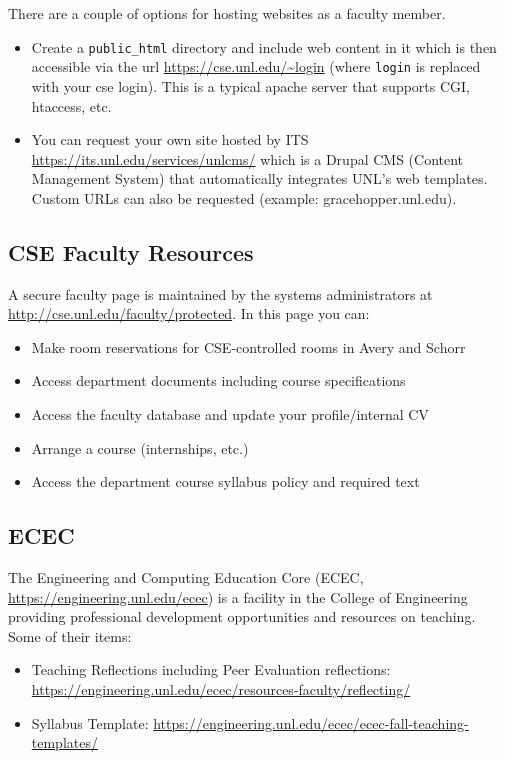 \documentclass[12pt]{scrartcl}
\begin{document}
There are a couple of options for hosting websites as a 
faculty member.

\begin{itemize}
  \item Create a \texttt{public_html} directory
  and include web content in it which is then accessible via the
  url \url{https://cse.unl.edu/~login} (where \texttt{login}
  is replaced with your cse login).  This is a typical apache server
  that supports CGI, htaccess, etc.
  \item You can request your own site hosted by ITS
  \url{https://its.unl.edu/services/unlcms/} which is a Drupal
  CMS (Content Management System) that automatically 
  integrates UNL's web templates.  Custom URLs can also
  be requested (example: gracehopper.unl.edu).
\end{itemize}

\subsection{CSE Faculty Resources}

A secure faculty page is maintained by the systems administrators
at \url{http://cse.unl.edu/faculty/protected}.  In this page you can:
\begin{itemize}
  \item Make room reservations for CSE-controlled rooms in Avery and Schorr
  \item Access department documents including course specifications
  \item Access the faculty database and update your profile/internal CV
  \item Arrange a course (internships, etc.)
  \item Access the department course syllabus policy and required text
\end{itemize}

\subsection{ECEC}

The Engineering and Computing Education Core (ECEC, \url{https://engineering.unl.edu/ecec})
is a facility in the College of Engineering providing professional development
opportunities and resources on teaching.  Some of their items:
\begin{itemize}
  \item Teaching Reflections including Peer Evaluation reflections: \url{https://engineering.unl.edu/ecec/resources-faculty/reflecting/}
  \item Syllabus Template: \url{https://engineering.unl.edu/ecec/ecec-fall-teaching-templates/}
\end{itemize}
\end{document}
